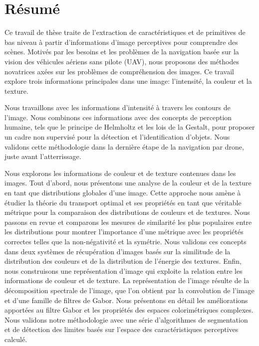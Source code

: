 \chapter*{Résumé}

\vspace*{-8ex}
\noindent Ce travail de thèse traite de l'extraction de caractéristiques et de primitives de bas niveau à partir d'informations d'image perceptives pour comprendre des scènes. Motivés par les besoins et les problèmes de la navigation basée sur la vision des véhicules aériens sans pilote (UAV), nous proposons des méthodes novatrices axées sur les problèmes de compréhension des images. Ce travail explore trois informations principales dans une image: l'intensité, la couleur et la texture.
\newline 

\noindent Nous travaillons avec les informations d'intensité à travers les contours de l'image. Nous combinons ces informations avec des concepts de perception humaine, tels que le principe de Helmholtz et les lois de la Gestalt, pour proposer un cadre non supervisé pour la détection et l'identification d'objets. Nous validons cette méthodologie dans la dernière étape de la navigation par drone, juste avant l'atterrissage.
\newline 

\noindent Nous explorons les informations de couleur et de texture contenues dans les images. Tout d'abord, nous présentons une analyse de la couleur et de la texture en tant que distributions globales d'une image. Cette approche nous amène à étudier la théorie du transport optimal et ses propriétés en tant que véritable métrique pour la comparaison des distributions de couleurs et de textures. Nous passons en revue et comparons les mesures de similarité les plus populaires entre les distributions pour montrer l'importance d'une métrique avec les propriétés correctes telles que la non-négativité et la symétrie. Nous validons ces concepts dans deux systèmes de récupération d'images basés sur la similitude de la distribution des couleurs et de la distribution de l'énergie des textures.
\noindent Enfin, nous construisons une représentation d'image qui exploite la relation entre les informations de couleur et de texture. La représentation de l'image résulte de la décomposition spectrale de l'image, que l'on obtient par la convolution de l'image et d'une famille de filtres de Gabor. Nous présentons en détail les améliorations apportées au filtre Gabor et les propriétés des espaces colorimétriques complexes. Nous validons notre méthodologie avec une série d'algorithmes de segmentation et de détection des limites basés sur l'espace des caractéristiques perceptives calculé.

